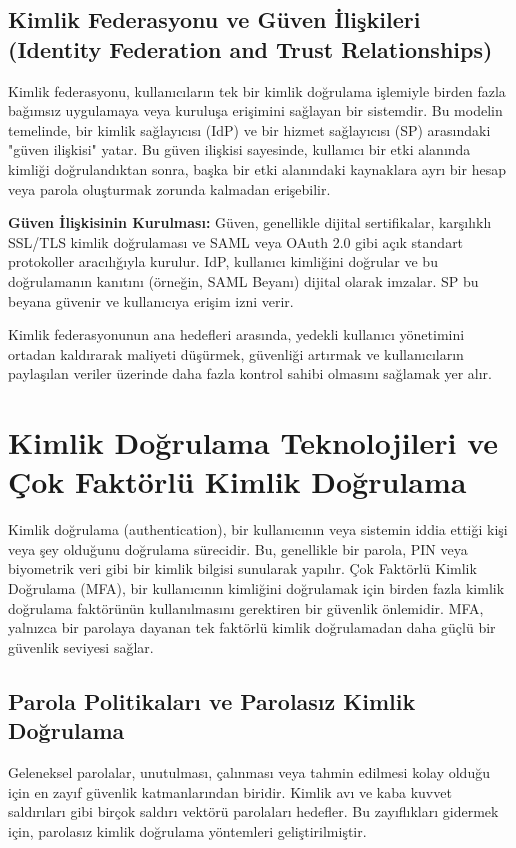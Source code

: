 \subsection{Kimlik Federasyonu ve Güven İlişkileri (Identity Federation and Trust Relationships)}

Kimlik federasyonu, kullanıcıların tek bir kimlik doğrulama işlemiyle birden fazla bağımsız uygulamaya veya kuruluşa erişimini sağlayan bir sistemdir. Bu modelin temelinde, bir kimlik sağlayıcısı (IdP) ve bir hizmet sağlayıcısı (SP) arasındaki "güven ilişkisi" yatar. Bu güven ilişkisi sayesinde, kullanıcı bir etki alanında kimliği doğrulandıktan sonra, başka bir etki alanındaki kaynaklara ayrı bir hesap veya parola oluşturmak zorunda kalmadan erişebilir.

\textbf{Güven İlişkisinin Kurulması:} Güven, genellikle dijital sertifikalar, karşılıklı SSL/TLS kimlik doğrulaması ve SAML veya OAuth 2.0 gibi açık standart protokoller aracılığıyla kurulur. IdP, kullanıcı kimliğini doğrular ve bu doğrulamanın kanıtını (örneğin, SAML Beyanı) dijital olarak imzalar. SP bu beyana güvenir ve kullanıcıya erişim izni verir.

Kimlik federasyonunun ana hedefleri arasında, yedekli kullanıcı yönetimini ortadan kaldırarak maliyeti düşürmek, güvenliği artırmak ve kullanıcıların paylaşılan veriler üzerinde daha fazla kontrol sahibi olmasını sağlamak yer alır.

\section{Kimlik Doğrulama Teknolojileri ve Çok Faktörlü Kimlik Doğrulama}
Kimlik doğrulama (authentication), bir kullanıcının veya sistemin iddia ettiği kişi veya şey olduğunu doğrulama sürecidir. Bu, genellikle bir parola, PIN veya biyometrik veri gibi bir kimlik bilgisi sunularak yapılır. Çok Faktörlü Kimlik Doğrulama (MFA), bir kullanıcının kimliğini doğrulamak için birden fazla kimlik doğrulama faktörünün kullanılmasını gerektiren bir güvenlik önlemidir. MFA, yalnızca bir parolaya dayanan tek faktörlü kimlik doğrulamadan daha güçlü bir güvenlik seviyesi sağlar.

\subsection{Parola Politikaları ve Parolasız Kimlik Doğrulama}

Geleneksel parolalar, unutulması, çalınması veya tahmin edilmesi kolay olduğu için en zayıf güvenlik katmanlarından biridir. Kimlik avı ve kaba kuvvet saldırıları gibi birçok saldırı vektörü parolaları hedefler. Bu zayıflıkları gidermek için, parolasız kimlik doğrulama yöntemleri geliştirilmiştir.


